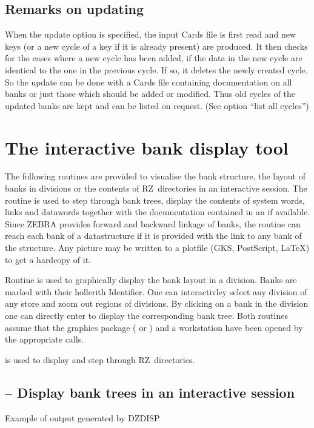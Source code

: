 \subsection*{Remarks on updating}
 
When the update option is specified, the input Cards file is
first read and new keys (or a new cycle of a key if it is already present)
are produced. 
It then checks for the cases where a new cycle has been added, if the data
in the new cycle are identical to the one in the previous cycle.
If so, it deletes the newly created cycle. 
So the update can be done
with a Cards file containing documentation on all banks or just
those which should be added or modified. 
Thus old cycles of the updated banks are kept and can be listed on request.
(See option ``list all cycles'')
 

\section{The interactive bank display tool}
\label{sec:dzdocdzdisp} 
 
The following routines are provided to visualise the bank structure,
the layout of banks in divisions or the contents of RZ~directories 
in an interactive session. 
The routine 
is used to step through bank trees, display the contents of system
words, links and datawords together with the documentation contained
in an \RZfile{} if available.
Since ZEBRA provides forward and backward linkage of banks,
the routine can reach each bank of a datastructure if it is provided
with the link to any bank of the structure. 
Any picture may be written to a plotfile 
(GKS, PostScript, LaTeX) to get a hardcopy of it.
 
Routine  is used to graphically display the bank layout
in a division. 
Banks are marked with their hollerith Identifier.
One can interactivley select any division of any store and
zoom out regions of divisions. 
By clicking on a bank in the division
one can directly enter  to display the corresponding bank tree.
Both routines assume that the graphics package (\cite{bib-GKS1} or
\cite{bib-HIGZ}) and a workstation
have been opened by the appropriate calls.
 
 is used to display and step through RZ~directories.

\finalnewpage

\subsection[{\tt DZDISP} -- Display bank trees in an interactive session]%
           { -- Display bank trees in an interactive session}
\begin{Fighere}
\begin{center}
\caption{Example of output generated by DZDISP}
\label{fig:DZDOCFIG2}
\end{center}
\end{Fighere}
 
